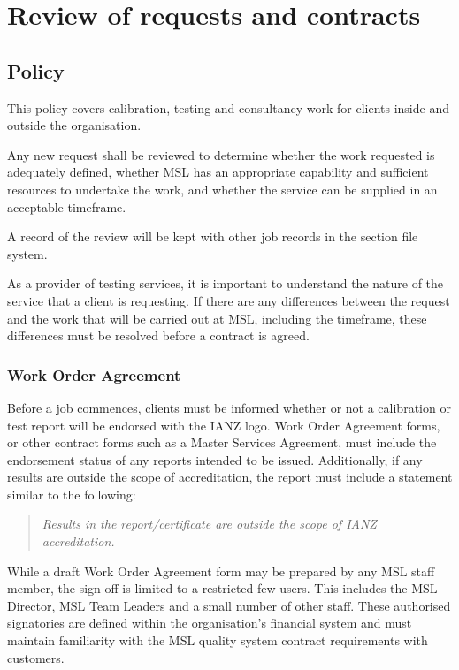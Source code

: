 \section{Review of requests and contracts}
\label{s:requests_and_tenders}
\subsection{Policy}
This policy covers calibration, testing and consultancy work for clients inside and outside the organisation.

Any new request shall be reviewed to determine whether the work requested is adequately defined, whether MSL has an appropriate capability and sufficient resources to undertake the work, and whether the service can be supplied in an acceptable timeframe.

A record of the review will be kept with other job records in the section file system.

As a provider of testing services, it is important to understand the nature of the service that a client is requesting. If there are any differences between the request and the work that will be carried out at MSL, including the timeframe, these differences must be resolved before a contract is agreed.

\subsubsection{Work Order Agreement}
Before a job commences, clients must be informed whether or not a calibration or test report will be endorsed with the IANZ logo.  Work Order Agreement forms, or other contract forms such as a Master Services Agreement, must include the endorsement status of any reports intended to be issued.  Additionally, if any results are outside the scope of accreditation, the report must include a statement similar to the following:
\begin{quote}
\textit{Results in the report/certificate are outside the scope of IANZ accreditation.}
\end{quote}

While a draft Work Order Agreement form may be prepared by any MSL staff member, the sign off is limited to a restricted few users.  This includes the MSL Director, MSL Team Leaders and a small number of other staff.  These authorised signatories are defined within the organisation's financial system and must maintain familiarity with the MSL quality system contract requirements with customers.


